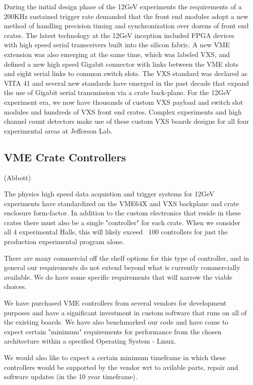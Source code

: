 During the initial design phase of the 12GeV experiments the requirements of a 200KHz sustained trigger rate demanded that the front end modules adopt a new method of handling precision timing and synchronization over dozens of front end crates. The latest technology at the 12GeV inception included FPGA devices with high speed serial transceivers built into the silicon fabric. A new VME extension was also emerging at the same time, which was labeled VXS, and defined a new high speed Gigabit connector with links between the VME slots and eight serial links to common switch slots. The VXS standard was declared as VITA 41 and several new standards have emerged in the past decade that expand the use of Gigabit serial transmission via a crate back-plane. For the 12GeV experiment era, we now have thousands of custom VXS payload and switch slot modules and hundreds of VXS front end crates. Complex experiments and high channel count detectors make use of these custom VXS boards  designs for all four experimental areas at Jefferson Lab.

\subsection{VME Crate Controllers} (Abbott)

The physics high speed data acquistion and trigger systems for 12GeV experiments have standardized on the VME64X and VXS
backplane and crate enclosure form-factor. In addition to the custom electronics that reside in these crates there must also be a single "controller" for each crate. When we consider all 4 experimental Halls, this will likely exceed ~100 controllers for just the production experimental program alone.

There are many commercial off the shelf options for this type of controller, and in general our requirements do not extend beyond what is currently commercially available. We do have some specific requirements that will narrow the viable choices.

We have purchased VME controllers from several vendors for development purposes and have a significant investment in custom software that runs on all of the existing boards. We have also benchmarked our code and have come to expect certain "minimum" requirements for performance from the chosen architecture within a specified Operating System - Linux.

We would also like to expect a certain minimum timeframe in which these controllers would be supported by the vendor wrt to avilable parts, repair and software updates (in the 10 year timeframe).

